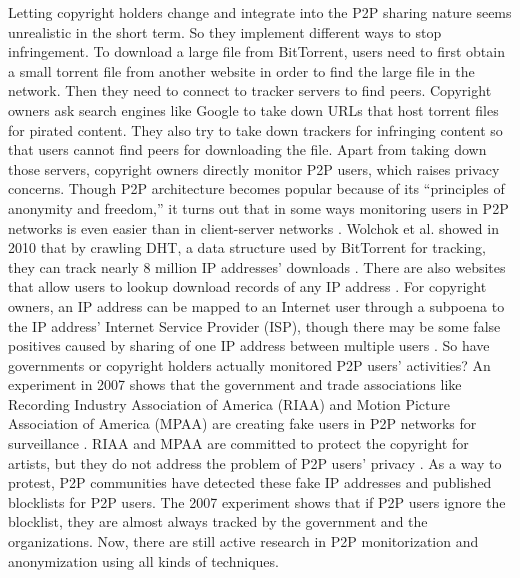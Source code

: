 \documentclass[12pt]{article}
\begin{document}
Letting copyright holders change and integrate into the P2P sharing nature seems unrealistic in the short term. So they implement different ways to stop infringement. To download a large file from BitTorrent, users need to first obtain a small torrent file from another website in order to find the large file in the network. Then they need to connect to tracker servers to find peers. Copyright owners ask search engines like Google to take down URLs that host torrent files for pirated content. They also try to take down trackers for infringing content so that users cannot find peers for downloading the file. Apart from taking down those servers, copyright owners directly monitor P2P users, which raises privacy concerns. Though P2P architecture becomes popular because of its ``principles of anonymity and freedom,'' it turns out that in some ways monitoring users in P2P networks is even easier than in client-server networks \cite{37_1698430}. Wolchok et al. showed in 2010 that by crawling DHT, a data structure used by BitTorrent for tracking, they can track nearly 8 million IP addresses' downloads \cite{40_wolchok2010crawling}. There are also websites that allow users to lookup download records of any IP address \cite{34_FrenchPresident, 35_YourTorrent, 36_YouHaveDownloaded}. For copyright owners, an IP address can be mapped to an Internet user through a subpoena to the IP address' Internet Service Provider (ISP), though there may be some false positives caused by sharing of one IP address between multiple users \cite{14_lemley2005quick}. So have governments or copyright holders actually monitored P2P users' activities? An experiment in 2007 shows that the government and trade associations like Recording Industry Association of America (RIAA) and Motion Picture Association of America (MPAA) are creating fake users in P2P networks for surveillance \cite{48_banerjee2007p2p}. RIAA and MPAA are committed to protect the copyright for artists, but they do not address the problem of P2P users' privacy \cite{56_RIAA, 57_MPAA}. As a way to protest, P2P communities have detected these fake IP addresses and published blocklists for P2P users. The 2007 experiment shows that if P2P users ignore the blocklist, they are almost always tracked by the government and the organizations. Now, there are still active research in P2P monitorization and anonymization using all kinds of techniques. 
\end{document}
